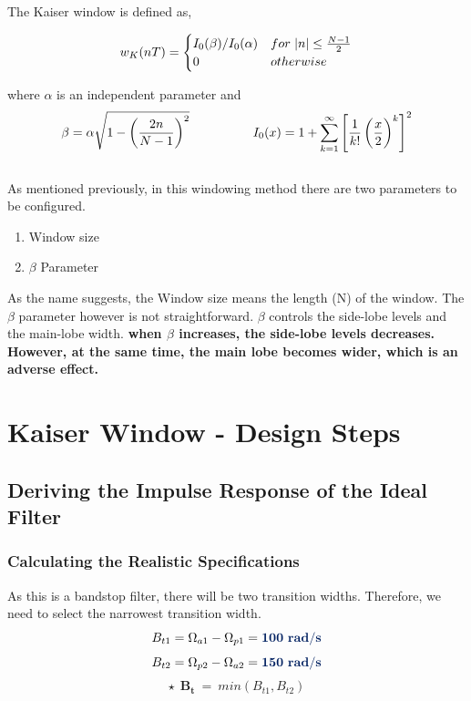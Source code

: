 \documentclass[11pt]{article}
\begin{document}
The Kaiser window is defined as,

\[
	w_K(nT) = \begin{cases}
	I_0(\beta)/I_0(\alpha) & for \hspace*{3pt} \abs{n}  \leq \frac{N-1}{2}  \\
	0 & otherwise 
	\end{cases}
\]


where $\alpha$ is an independent parameter and\\
$$\beta = \alpha\sqrt{1-\left(\frac{2n}{N-1}\right)^2} \hspace*{50pt} I_0(x) = 1+\sum_{k=1}^{\infty}\left[\frac{1}{k!}\left(\frac{x}{2}\right)^k\right]^2$$\\

As mentioned previously, in this windowing method there are two parameters to be configured.

\begin{enumerate}
	\item Window size
	\item $\beta$ Parameter
\end{enumerate}

As the name suggests, the Window size means the length (N) of the window.
The $\beta$ parameter however is not straightforward. $\beta$ controls the side-lobe levels and the main-lobe width.\cite{kaiser_window_beta_parameter}
{\bf when $ \beta $ increases, the side-lobe levels decreases. However, at the same time, the main lobe becomes wider, which is an adverse effect. }

\clearpage
\section{Kaiser Window - Design Steps}


\subsection{Deriving the Impulse Response of the Ideal Filter}
\subsubsection{Calculating the Realistic Specifications}
As this is a bandstop filter, there will be two transition widths. Therefore, we need to select the narrowest transition width.
$$B_{t1} =  \Omega_{a1}-\Omega_{p1} = \mathbf{\color{ultramarine}100 \ rad/s}$$ 
$$B_{t2} =  \Omega_{p2}-\Omega_{a2} = \mathbf{\color{ultramarine}150 \ rad/s}$$
$$ \star \ \  \mathbf{B_{t}} \ =\ min( B_{t1} ,B_{t2})$$
\end{document}
